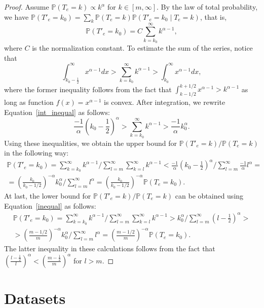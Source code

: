 \documentclass{article}
\renewcommand{\P}{\mathbb{P}}
\begin{document}
\begin{proof}
Assume $\P(T_e=k)\propto k^{\alpha}$ for $k\in [m,\infty]$. By the law of total probability, we have $\P(T'_e=k_0)= \sum_{k}\P(T_e=k)\P(T'_e=k_0\mid T_e=k)$, that is,
$$
\P(T'_e=k_0) = C \sum_{k=k_0}^{\infty} k^{\alpha-1},
$$
where $C$ is the normalization constant. To estimate the sum of the series, notice that
\begin{equation}\label{int_inequal}
\int_{k_0-\frac{1}{2}}^\infty x^{\alpha-1} dx > \sum_{k=k_0}^{\infty} k^{\alpha-1} > \int_{k_0}^\infty x^{\alpha-1} dx,    
\end{equation}
where the former inequality follows from the fact that $\int_{k-1/2}^{k+1/2} x^{\alpha-1}> k^{\alpha-1}$ as long as function $f(x)=x^{\alpha-1}$ is convex. After integration, we rewrite Equation~\ref{int_inequal} as follows:
\begin{equation}\label{inequal}
\frac{-1}{\alpha} \left ( k_0-\frac{1}{2}\right )^{\alpha} > \sum_{k=k_0}^{\infty} k^{\alpha-1} > \frac{-1}{\alpha} k_0^{\alpha}. \end{equation}
Using these inequalities, we obtain the upper bound for $\P(T'_e=k)/\P(T_e=k)$ in the following way:
\begin{multline*}
\P(T'_e=k_0) = \sum_{k=k_0}^{\infty} k^{\alpha-1} / \sum_{l=m}^\infty \sum_{k=l}^{\infty} k^{\alpha-1} < \frac{-1}{\alpha} \left ( k_0-\frac{1}{2}\right )^{\alpha} / \sum_{l=m}^\infty \frac{-1}{\alpha} l^{\alpha} = \\
=\left (\frac{k_0}{k_0-1/2}\right )^{-\alpha} k_0^\alpha/\sum_{l=m}^\infty l^{\alpha} = \left (\frac{k_0}{k_0-1/2}\right )^{-\alpha} \P(T_e=k_0).
\end{multline*}
At last, the lower bound for $\P(T'_e=k)/\P(T_e=k)$ can be obtained using Equation~\ref{inequal} as follows:
\begin{multline*}
\P(T'_e=k_0) = \sum_{k=k_0}^{\infty} k^{\alpha-1} / \sum_{l=m}^\infty \sum_{k=l}^{\infty} k^{\alpha-1} > k_0^{\alpha} / \sum_{l=m}^\infty  \left (l-\frac{1}{2}\right )^{\alpha} > \\
> \left (\frac{m-1/2}{m}\right )^{-\alpha} k_0^\alpha/\sum_{l=m}^\infty l^{\alpha} = \left (\frac{m-1/2}{m}\right )^{-\alpha} \P(T_e=k_0).
\end{multline*}
The latter inequality in these calculations follows from the fact that $\left (\frac{l-\frac{1}{2}}{l}\right )^{\alpha}<\left (\frac{m-\frac{1}{2}}{m}\right )^{\alpha}$ for $l>m$.

\end{proof}

\section{Datasets} \label{sec-datasets}
\end{document}
